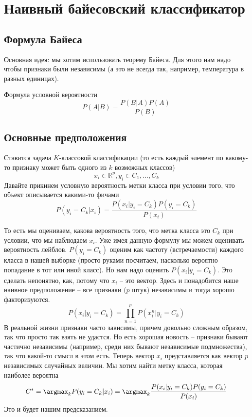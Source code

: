 \documentclass[a4paper, 14pt]{article}
\begin{document}
    
    
    \section{Наивный байесовский классификатор}
    
    \subsection{Формула Байеса}
    
    Основная идея: мы хотим использовать теорему Байеса.
    Для этого нам надо чтобы признаки были независимы (а это не всегда так, например, температура в разных единицах).
    
    Формула условной вероятности
    \[ P(A|B) = \frac{P(B|A)P(A)}{P(B)} \]
    
    \subsection{Основные предположения}
    
    Ставится задача $K$-классовой классификации (то есть каждый элемент по какому-то признаку может быть одного из $k$
    возможных классов)
    \[ x_i \in \mathbb{R}^p, y_i \in {C_1, \dots , C_k} \]
    Давайте прикинем условную вероятность метки класса при условии того, что объект описывается какими-то фичами
    \[ P(y_i = C_k|x_i) = \frac{P(x_i|y_i = C_k)P(y_i = C_k)}{P(x_i)} \]
    
    То есть мы оцениваем, какова вероятность того, что метка класса это $C_k$ при условии, что мы наблюдаем $x_i$.
    Уже имея данную формулу мы можем оценивать вероятность лейблов.
    $P(y_i = C_k)$ оценим как частоту (встречаемости) каждого класса в нашей выборке (просто руками посчитаем, насколько
    вероятно попадание в тот или иной класс).
    Но нам надо оценить $P(x_i|y_i = C_k)$.
    Это сделать непонятно, как, потому что $x_i$ -- это вектор.
    Здесь и понадобится наше наивное предположение -- все признаки ($p$ штук) независимы и тогда хорошо факторизуются.
    \[ P(x_i|y_i = C_k) = \prod^p_{n=1} P(x^n_i|y_i = C_k) \]
    В реальной жизни признаки часто зависимы, причем довольно сложным образом, так что просто так взять не удастся.
    Но есть хорошая новость -- признаки бывают частично независимы (например, среди них бывают независимые
    подмножества), так что какой-то смысл в этом есть.
    Теперь вектор $x_i$ представляется как вектор $p$ независимых случайных величин.
    Мы хотим найти метку класса, которая наиболее вероятна
    \[ C^* = \argmax_k P(y_i = C_k|x_i) = \argmax_k \frac{P(x_i|y_i = C_k) P(y_i = C_k)}{P(x_i)} \]
    Это и будет нашим предсказанием.
    
\end{document}
